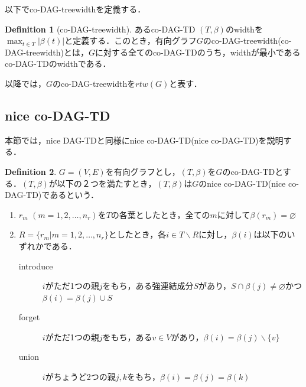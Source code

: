 \documentclass[master]{kuisthesis}		%
\theoremstyle{plain}
\theoremstyle{definition}
\newtheorem{definition*}{Definition}
\begin{document}
以下でco-DAG-treewidthを定義する．

\begin{definition*}[co-DAG-treewidth]
    あるco-DAG-TD $(T, \beta)$のwidthを$\max_{t \in T}|\beta(t)|$と定義する．このとき，有向グラフ$G$のco-DAG-treewidth(co-DAG-treewidth)とは，$G$に対する全てのco-DAG-TDのうち，widthが最小であるco-DAG-TDのwidthである．
\end{definition*}

以降では，$G$のco-DAG-treewidthを$rtw(G)$と表す．


\subsection{nice co-DAG-TD}

本節では，nice DAG-TDと同様にnice co-DAG-TD(nice co-DAG-TD)を説明する．

\begin{definition*}
 $G=(V, E)$を有向グラフとし，$(T, \beta)$を$G$のco-DAG-TDとする．$(T, \beta)$が以下の２つを満たすとき，$(T, \beta)$は$G$のnice co-DAG-TD(nice co-DAG-TD)であるという．
 
\begin{enumerate}
    \item $r_m$ $(m = 1, 2, \dots, n_r)$を$T$の各葉としたとき，全ての$m$に対して$\beta(r_m) = \varnothing$ 
    \item $R = \{r_m | m = 1, 2, \dots, n_r\}$としたとき，各$i \in T \backslash R$に対し，$\beta(i)$は以下のいずれかである．
    \begin{description}
          \item[introduce] $i$がただ1つの親$j$をもち，ある強連結成分$S$があり，$S \cap \beta(j) \neq \varnothing$かつ$\beta(i) = \beta(j) \cup S$
          \item[forget] $i$がただ1つの親$j$をもち，ある$v \in V$があり，$\beta(i) = \beta(j) \backslash \{v\}$
          \item[union] $i$がちょうど2つの親$j, k$をもち，$\beta(i) = \beta(j) = \beta(k)$
    \end{description}
    \end{enumerate}
\end{definition*}
\end{document}
